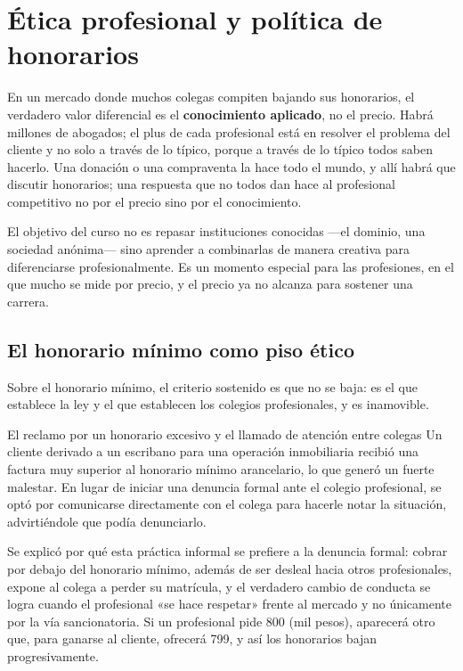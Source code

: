 \documentclass[12pt,oneside]{book}
\begin{document}
\section{Ética profesional y política de honorarios}
\label{sec:honorarios}

En un mercado donde muchos colegas compiten bajando sus honorarios, el verdadero valor diferencial es el \textbf{conocimiento aplicado}, no el precio. Habrá millones de abogados; el plus de cada profesional está en resolver el problema del cliente y no solo a través de lo típico, porque a través de lo típico todos saben hacerlo. Una donación o una compraventa la hace todo el mundo, y allí habrá que discutir honorarios; una respuesta que no todos dan hace al profesional competitivo no por el precio sino por el conocimiento.

\begin{important}
El objetivo del curso no es repasar instituciones conocidas ---el dominio, una sociedad anónima--- sino aprender a combinarlas de manera creativa para diferenciarse profesionalmente. Es un momento especial para las profesiones, en el que mucho se mide por precio, y el precio ya no alcanza para sostener una carrera.
\end{important}

\subsection{El honorario mínimo como piso ético}

Sobre el honorario mínimo, el criterio sostenido es que no se baja: es el que establece la ley y el que establecen los colegios profesionales, y es inamovible.

\begin{example}{El reclamo por un honorario excesivo y el llamado de atención entre colegas}
Un cliente derivado a un escribano para una operación inmobiliaria recibió una factura muy superior al honorario mínimo arancelario, lo que generó un fuerte malestar. En lugar de iniciar una denuncia formal ante el colegio profesional, se optó por comunicarse directamente con el colega para hacerle notar la situación, advirtiéndole que podía denunciarlo.

Se explicó por qué esta práctica informal se prefiere a la denuncia formal: cobrar por debajo del honorario mínimo, además de ser desleal hacia otros profesionales, expone al colega a perder su matrícula, y el verdadero cambio de conducta se logra cuando el profesional «se hace respetar» frente al mercado y no únicamente por la vía sancionatoria. Si un profesional pide 800 (mil pesos), aparecerá otro que, para ganarse al cliente, ofrecerá 799, y así los honorarios bajan progresivamente.
\end{example}
\end{document}
